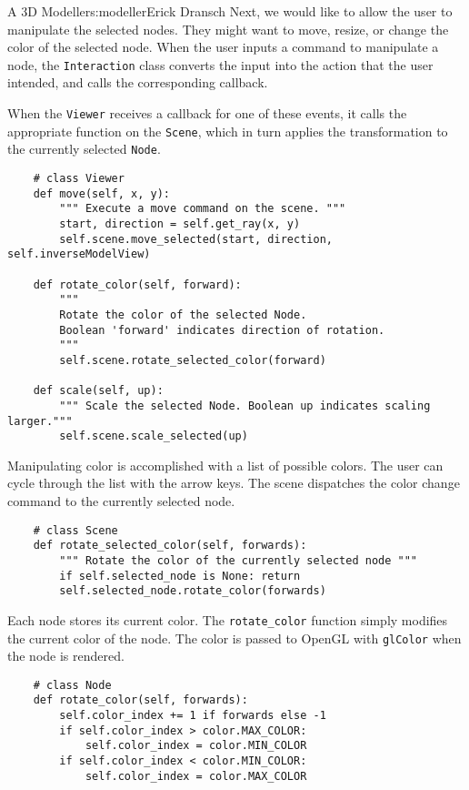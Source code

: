 \begin{aosachapter}{A 3D Modeller}{s:modeller}{Erick Dransch}
Next, we would like to allow the user to manipulate the selected nodes.
They might want to move, resize, or change the color of the selected
node. When the user inputs a command to manipulate a node, the
\texttt{Interaction} class converts the input into the action that the
user intended, and calls the corresponding callback.

When the \texttt{Viewer} receives a callback for one of these events, it
calls the appropriate function on the \texttt{Scene}, which in turn
applies the transformation to the currently selected \texttt{Node}.

\begin{verbatim}
    # class Viewer
    def move(self, x, y):
        """ Execute a move command on the scene. """
        start, direction = self.get_ray(x, y)
        self.scene.move_selected(start, direction, self.inverseModelView)
    
    def rotate_color(self, forward):
        """ 
        Rotate the color of the selected Node. 
        Boolean 'forward' indicates direction of rotation. 
        """
        self.scene.rotate_selected_color(forward)
    
    def scale(self, up):
        """ Scale the selected Node. Boolean up indicates scaling larger."""
        self.scene.scale_selected(up)
\end{verbatim}

\label{changing-color}

Manipulating color is accomplished with a list of possible colors. The
user can cycle through the list with the arrow keys. The scene
dispatches the color change command to the currently selected node.

\begin{verbatim}
    # class Scene
    def rotate_selected_color(self, forwards):
        """ Rotate the color of the currently selected node """
        if self.selected_node is None: return
        self.selected_node.rotate_color(forwards)
\end{verbatim}

Each node stores its current color. The \texttt{rotate\_color} function
simply modifies the current color of the node. The color is passed to
OpenGL with \texttt{glColor} when the node is rendered.

\begin{verbatim}
    # class Node
    def rotate_color(self, forwards):
        self.color_index += 1 if forwards else -1
        if self.color_index > color.MAX_COLOR:
            self.color_index = color.MIN_COLOR
        if self.color_index < color.MIN_COLOR:
            self.color_index = color.MAX_COLOR
\end{verbatim}


\end{aosachapter}
